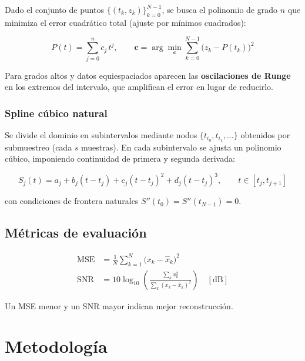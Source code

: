 \documentclass[12pt,a4paper]{article}
\begin{document}
Dado el conjunto de puntos $\{(t_k, z_k)\}_{k=0}^{N-1}$, se busca el polinomio
de grado $n$ que minimiza el error cuadrático total (ajuste por mínimos cuadrados):

\begin{equation}
  P(t) = \sum_{j=0}^{n} c_j\, t^j, \qquad
  \mathbf{c} = \arg\min_{\mathbf{c}} \sum_{k=0}^{N-1}\bigl(z_k - P(t_k)\bigr)^2
\end{equation}

Para grados altos y datos equiespaciados aparecen las \textbf{oscilaciones de Runge}
en los extremos del intervalo, que amplifican el error en lugar de reducirlo.

\subsubsection*{Spline cúbico natural}

Se divide el dominio en subintervalos mediante nodos $\{t_{i_0}, t_{i_1}, \ldots\}$
obtenidos por submuestreo (cada $s$ muestras). En cada subintervalo se ajusta un
polinomio cúbico, imponiendo continuidad de primera y segunda derivada:

\begin{equation}
  S_j(t) = a_j + b_j(t - t_j) + c_j(t-t_j)^2 + d_j(t-t_j)^3,
  \qquad t \in [t_j, t_{j+1}]
\end{equation}

con condiciones de frontera naturales $S''(t_0) = S''(t_{N-1}) = 0$.

\subsection{Métricas de evaluación}

\begin{align}
  \mathrm{MSE} &= \frac{1}{N}\sum_{k=1}^{N}\bigl(x_k - \hat{x}_k\bigr)^2
  \label{eq:mse}\\[4pt]
  \mathrm{SNR} &= 10\log_{10}\!\left(\frac{\displaystyle\sum_{k}x_k^2}
  {\displaystyle\sum_{k}(x_k-\hat{x}_k)^2}\right) \quad [\mathrm{dB}]
  \label{eq:snr}
\end{align}

Un MSE menor y un SNR mayor indican mejor reconstrucción.

\section{Metodología}
\end{document}
